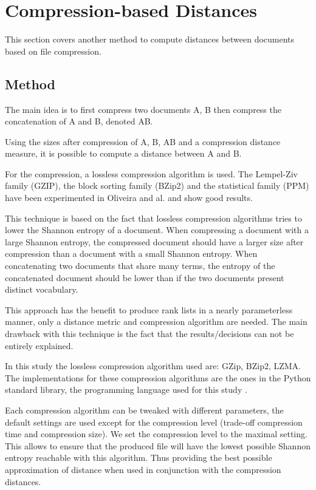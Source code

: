 \section{Compression-based Distances \label{sec:compression_based_distances}}

This section covers another method to compute distances between documents based on file compression.

\subsection{Method}

The main idea is to first compress two documents A, B then compress the concatenation of A and B, denoted AB.

Using the sizes after compression of A, B, AB and a compression distance measure, it is possible to compute a distance between A and B.

For the compression, a lossless compression algorithm is used.
The Lempel-Ziv family (GZIP), the block sorting family (BZip2) and the statistical family (PPM) have been experimented in Oliveira and al. \cite{comparing_compression} and show good results.

This technique is based on the fact that lossless compression algorithms tries to lower the Shannon entropy of a document.
When compressing a document with a large Shannon entropy, the compressed document should have a larger size after compression than a document with a small Shannon entropy.
When concatenating two documents that share many terms, the entropy of the concatenated document should be lower than if the two documents present distinct vocabulary.

This approach has the benefit to produce rank lists in a nearly parameterless manner, only a distance metric and compression algorithm are needed.
The main drawback with this technique is the fact that the results/decisions can not be entirely explained.

In this study the lossless compression algorithm used are: GZip, BZip2, LZMA.
The implementations for these compression algorithms are the ones in the Python standard library, the programming language used for this study \cite{python_standard_library}.

Each compression algorithm can be tweaked with different parameters, the default settings are used except for the compression level (trade-off compression time and compression size).
We set the compression level to the maximal setting.
This allows to ensure that the produced file will have the lowest possible Shannon entropy reachable with this algorithm.
Thus providing the best possible approximation of distance when used in conjunction with the compression distances.

